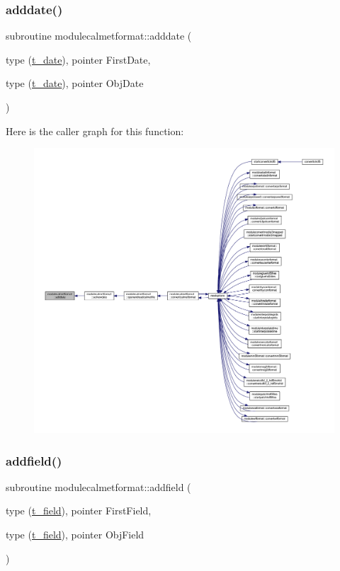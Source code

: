 \subsubsection{\texorpdfstring{adddate()}{adddate()}}
{\footnotesize\ttfamily subroutine modulecalmetformat\+::adddate (\begin{DoxyParamCaption}\item[{type (\mbox{\hyperlink{structmodulecalmetformat_1_1t__date}{t\+\_\+date}}), pointer}]{First\+Date,  }\item[{type (\mbox{\hyperlink{structmodulecalmetformat_1_1t__date}{t\+\_\+date}}), pointer}]{Obj\+Date }\end{DoxyParamCaption})\hspace{0.3cm}{\ttfamily [private]}}

Here is the caller graph for this function\+:\nopagebreak
\begin{figure}[H]
\begin{center}
\leavevmode
\includegraphics[width=350pt]{namespacemodulecalmetformat_ac2b80a87e09960dca9aab0ddc8af00b5_icgraph}
\end{center}
\end{figure}
\mbox{\label{namespacemodulecalmetformat_ad719aec457312263662ee69e4ff227fb}} 
\subsubsection{\texorpdfstring{addfield()}{addfield()}}
{\footnotesize\ttfamily subroutine modulecalmetformat\+::addfield (\begin{DoxyParamCaption}\item[{type (\mbox{\hyperlink{structmodulecalmetformat_1_1t__field}{t\+\_\+field}}), pointer}]{First\+Field,  }\item[{type (\mbox{\hyperlink{structmodulecalmetformat_1_1t__field}{t\+\_\+field}}), pointer}]{Obj\+Field }\end{DoxyParamCaption})\hspace{0.3cm}{\ttfamily [private]}}

